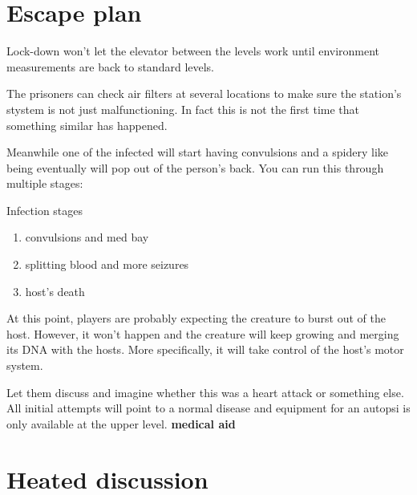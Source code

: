 \newsect

\newpage

\section{Escape plan}


\begin{rpg-commentbox}{}
    Lock-down won't let the elevator between the levels work until environment measurements are back to standard levels.
    
    
    The prisoners can check air filters at several locations to make sure the station's stystem is not just malfunctioning. In fact this is not the first time that something similar has happened. 
    
    
    Meanwhile one of the infected will start having convulsions and a spidery like being eventually will pop out of the person's back. 
    You can run this through multiple stages: 

\end{rpg-commentbox}




\begin{rpg-commentbox}{Infection stages}
    \begin{enumerate}
        \item convulsions and med bay
        \item splitting blood and more seizures
        \item host's death
    \end{enumerate}

    At this point, players are probably expecting the creature to burst out of the host. However, it won't happen and the creature will keep growing and merging its DNA with the hosts. More specifically, it will take control of the host's motor system.

    Let them discuss and imagine whether this was a heart attack or something else. All initial attempts will point to a normal disease and equipment for an autopsi is only available at the upper level.  \textbf{medical aid}
\end{rpg-commentbox}





\newsect

\section{Heated discussion}


